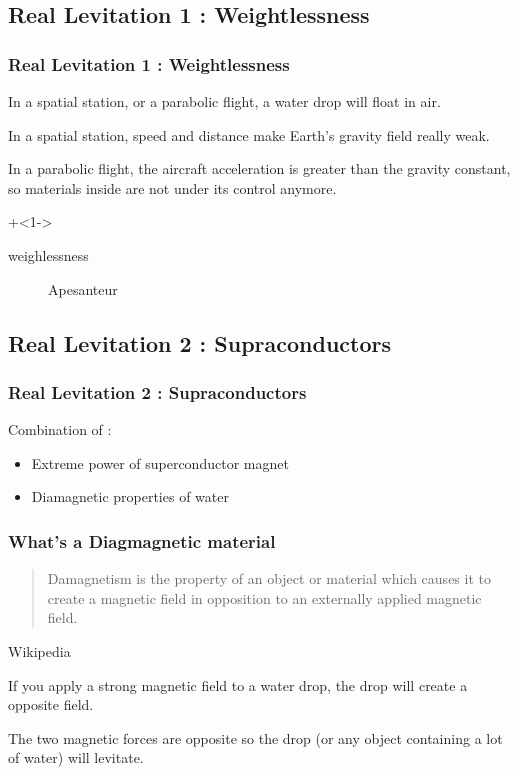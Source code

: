 \documentclass{beamer}
\begin{document}
\subsection{Real Levitation 1 : Weightlessness}
\begin{frame}
\frametitle{Real Levitation 1 : Weightlessness}

In a spatial station, or a parabolic flight, a water drop will float in air.

\pause

In a spatial station, speed and distance make Earth's gravity field really weak.

\pause

In a parabolic flight, the aircraft acceleration is greater than the gravity constant, so materials inside are not under
its control anymore.

\onslide+<1->
\begin{description} 
    \item[weighlessness] Apesanteur
\end{description}
\end{frame}

\subsection{Real Levitation 2 : Supraconductors}
\begin{frame}
\frametitle{Real Levitation 2 : Supraconductors}

Combination of :

\begin{itemize}
    \item Extreme power of superconductor magnet
    \item Diamagnetic properties of water
\end{itemize}
\end{frame}

\begin{frame}
\frametitle{What's a Diagmagnetic material}

\begin{quotation}
Damagnetism is the property of an object or material which causes it to create a magnetic field in opposition to an
externally applied magnetic field.
\end{quotation}
\begin{flushright}Wikipedia\end{flushright}

\pause

If you apply a strong magnetic field to a water drop, the drop will create a opposite field.
\medskip


The two magnetic forces are opposite so the drop (or any object containing a lot of water) will levitate.
\end{frame}
\end{document}

